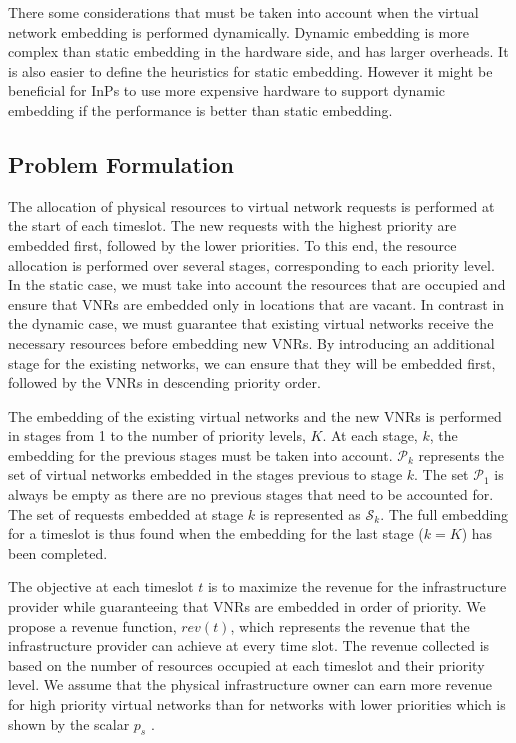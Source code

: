 \documentclass[conference]{IEEEtran}
\begin{document}
There some considerations that must be taken into account when the virtual network embedding is performed dynamically. Dynamic embedding is more complex than static embedding in the hardware side, and has larger overheads. It is also easier to define the heuristics for static embedding. However it might be beneficial for InPs to use more expensive hardware to support dynamic embedding if the performance is better than static embedding.













\subsection{Problem Formulation}
The allocation of physical resources to virtual network requests is performed at the start of each timeslot. The new requests with the highest priority are embedded first, followed by the lower priorities. To this end, the resource allocation is performed over several stages, corresponding to each priority level.
In the static case, we must take into account the resources that are occupied and ensure that VNRs are embedded only in locations that are vacant. In contrast in the dynamic case, we must guarantee that existing virtual networks receive the necessary resources before embedding new VNRs. By introducing an additional stage for the existing networks, we can ensure that they will be embedded first, followed by the VNRs in descending priority order.

The embedding of the existing virtual networks and the new VNRs is performed in stages from 1 to the number of priority levels, $K$. At each stage, $k$, the embedding for the previous stages must be taken into account. $\mathcal{P}_k$ represents the set of virtual networks embedded in the stages previous to stage $k$. The set $\mathcal{P}_1$ is always be empty as there are no previous stages that need to be accounted for. The set of requests embedded at stage $k$ is represented as $\mathcal{S}_k$. The full embedding for a timeslot is thus found when the embedding for the last stage ($k = K$) has been completed.

The objective at each timeslot $t$ is to maximize the revenue for the infrastructure provider while guaranteeing that VNRs are embedded in order of priority. We propose a revenue function, $rev(t)$, which represents the revenue that the infrastructure provider can achieve at every time slot. The revenue collected is based on the number of resources occupied at each timeslot and their priority level. We assume that the physical infrastructure owner can earn more revenue for high priority virtual networks than for networks with lower priorities which is shown by the scalar $p_s$ .
\end{document}
